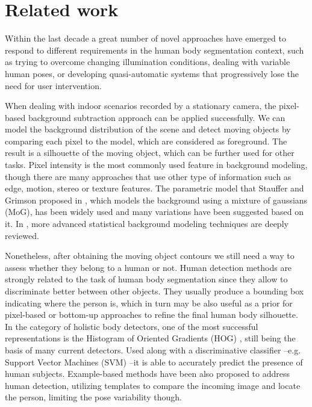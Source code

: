 \documentclass[10pt,twocolumn,letterpaper]{article}
\begin{document}
\section{Related work}
\label{sec:relatedwork}

Within the last decade a great number of novel approaches have emerged to respond to different requirements in the human body segmentation context, such as trying to overcome changing illumination conditions, dealing with variable human poses, or developing quasi-automatic systems that progressively lose the need for user intervention.
 
 When dealing with indoor scenarios recorded by a stationary camera, the pixel-based background subtraction approach can be applied successfully. We can model the background distribution of the scene and detect moving objects by comparing each pixel to the model, which are considered as foreground. The result is a silhouette of the moving object, which can be further used for other tasks. Pixel intensity is the most commonly used feature in background modeling, though there are many approaches that use other type of information such as edge, motion, stereo or texture features. The parametric model that Stauffer and Grimson proposed in \cite{stauffer1999adaptive}, which models the background using a mixture of gaussians (MoG), has been widely used and many variations have been suggested based on it. In \cite{bouwmans2011recent}, more advanced statistical background modeling techniques are deeply reviewed. 
 
Nonetheless, after obtaining the moving object contours we still need a way to assess whether they belong to a human or not. Human detection methods are strongly related to the task of human body segmentation since they allow to discriminate better between other objects. They usually produce a bounding box indicating where the person is, which in turn may be also useful as a prior for pixel-based or bottom-up approaches to refine the final human body silhouette. In the category of holistic body detectors, one of the most successful representations is the Histogram of Oriented Gradients (HOG) \cite{dalal2005histograms}, still being the basis of many current detectors. Used along with a discriminative classifier --e.g. Support Vector Machines (SVM) \cite{hearst1998support} --it is able to accurately predict the presence of human subjects. Example-based methods \cite{andriluka2010monocular} have been also proposed to address human detection, utilizing templates to compare the incoming image and locate the person, limiting the pose variability though.  
\end{document}
